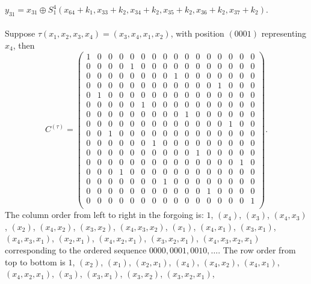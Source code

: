 $y_{31}=
x_{31} \oplus S_1^4(x_{64}+k_1,x_{33}+k_2,x_{34}+k_2, x_{35}+k_2, x_{36}+k_2, x_{37}+k_2)$.
\\
\\
Suppose $\tau (x_1, x_2, x_3, x_4)= (x_3, x_4, x_1, x_2)$, with position $(0001)$ representing
$x_4$, then
$$C^{(\tau)}=
\left(
\begin{array}{cccccccc|cccccccc}
1 & 0 & 0 & 0 & 0 & 0 & 0 & 0 & 0 & 0 & 0 & 0 & 0 & 0 & 0 & 0\\
0 & 0 & 0 & 0 & 1 & 0 & 0 & 0 & 0 & 0 & 0 & 0 & 0 & 0 & 0 & 0\\
0 & 0 & 0 & 0 & 0 & 0 & 0 & 0 & 1 & 0 & 0 & 0 & 0 & 0 & 0 & 0\\
0 & 0 & 0 & 0 & 0 & 0 & 0 & 0 & 0 & 0 & 0 & 0 & 1 & 0 & 0 & 0\\
0 & 1 & 0 & 0 & 0 & 0 & 0 & 0 & 0 & 0 & 0 & 0 & 0 & 0 & 0 & 0\\
0 & 0 & 0 & 0 & 0 & 1 & 0 & 0 & 0 & 0 & 0 & 0 & 0 & 0 & 0 & 0\\
0 & 0 & 0 & 0 & 0 & 0 & 0 & 0 & 0 & 1 & 0 & 0 & 0 & 0 & 0 & 0\\
0 & 0 & 0 & 0 & 0 & 0 & 0 & 0 & 0 & 0 & 0 & 0 & 0 & 1 & 0 & 0\\
0 & 0 & 1 & 0 & 0 & 0 & 0 & 0 & 0 & 0 & 0 & 0 & 0 & 0 & 0 & 0\\
0 & 0 & 0 & 0 & 0 & 0 & 1 & 0 & 0 & 0 & 0 & 0 & 0 & 0 & 0 & 0\\
0 & 0 & 0 & 0 & 0 & 0 & 0 & 0 & 0 & 0 & 1 & 0 & 0 & 0 & 0 & 0\\
0 & 0 & 0 & 0 & 0 & 0 & 0 & 0 & 0 & 0 & 0 & 0 & 0 & 0 & 1 & 0\\
0 & 0 & 0 & 1 & 0 & 0 & 0 & 0 & 0 & 0 & 0 & 0 & 0 & 0 & 0 & 0\\
0 & 0 & 0 & 0 & 0 & 0 & 0 & 1 & 0 & 0 & 0 & 0 & 0 & 0 & 0 & 0\\
0 & 0 & 0 & 0 & 0 & 0 & 0 & 0 & 0 & 0 & 0 & 1 & 0 & 0 & 0 & 0\\
0 & 0 & 0 & 0 & 0 & 0 & 0 & 0 & 0 & 0 & 0 & 0 & 0 & 0 & 0 & 1\\
\end{array}
\right).$$
The column order from left to right in the forgoing is:
$1$, $(x_4)$, $(x_3)$, $(x_4, x_3)$, $(x_2)$, $(x_4, x_2)$, $(x_3, x_2)$, $(x_4, x_3, x_2)$,
$(x_1)$, $(x_4, x_1)$, $(x_3, x_1)$, $(x_4, x_3, x_1)$,
$(x_2, x_1)$, $(x_4, x_2, x_1)$, $(x_3, x_2, x_1)$, $(x_4, x_3, x_2, x_1)$
corresponding to the ordered sequence $0000, 0001, 0010, \ldots$.
The row order from top to bottom is
$1$, $(x_2)$, $(x_1)$, $(x_2, x_1)$, $(x_4)$, $(x_4, x_2)$, $(x_4, x_1)$, $(x_4, x_2, x_1)$, 
$(x_3)$, $(x_3, x_1)$, $(x_3, x_2)$, $(x_3, x_2, x_1)$, 
